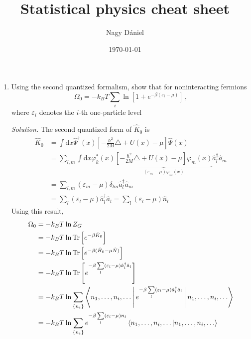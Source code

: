 \documentclass[11pt, a4paper]{article}
\title{Statistical physics cheat sheet}
\author{Nagy Dániel}
\date{\today}
\newcommand{\dd}{\mathrm{d}}
\newcommand{\Tr}[1]{\mathrm{Tr}\left[#1\right]}
\begin{document}
\maketitle
\newpage

\begin{enumerate}
    \item Using the second quantized formalism, show that for noninteracting fermions
    \begin{equation*}
        \Omega_0 = -k_BT\sum\limits_i \ln \left[1 + e^{-\beta(\varepsilon_i - \mu)}\right]\,,
    \end{equation*}
    where $\varepsilon_i$ denotes the $i$-th one-particle level
    \par\textit{Solution.}
    The second quantized form of $\hat K_0$ is 
    \begin{align*}
        \hat K_0 &= \int \dd x \hat\Psi^{\dagger}(x)\left[-\frac{\hbar^2}{2M}\triangle + U(x)
        -\mu\right]\hat\Psi(x) \\
        & = \sum\limits_{l,m} \int \dd x  \varphi_k^*(x)\underbrace{\left[-\frac{\hbar^2}{2M}\triangle + U(x)
        -\mu\right]\varphi_m(x)}_{(\varepsilon_m - \mu)\varphi_m(x)} \hat a_l^{\dagger}\hat a_m \\
        & = \sum\limits_{l,m}(\varepsilon_m - \mu)\delta_{lm} \hat a_l^{\dagger}\hat a_m \\
        & = \sum\limits_l (\varepsilon_l-\mu) \hat a_l^{\dagger}\hat a_l 
        = \sum\limits_l (\varepsilon_l-\mu) \hat n_l
    \end{align*}
    Using this result, 
    \begin{align*}
        \Omega_0 &= -k_BT\ln Z_G\\
        &= -k_BT \ln \Tr{e^{-\beta \hat K_0}}\\
        &= -k_BT \ln \Tr{e^{-\beta (\hat H_0 - \mu\hat N)}}\\
        &= -k_BT \ln \Tr{e^{-\beta \sum\limits_l(\varepsilon_l - \mu)\hat a_l^{\dagger}\hat a_l}}\\
        &= -k_BT \ln \sum\limits_{\{n_i\}}\Braket{n_1, \dots, n_i, \dots | e^{-\beta \sum\limits_l(\varepsilon_l-\mu) \hat a_l^{\dagger} \hat a_l}| n_1, \dots, n_i, \dots }\\
        &= -k_BT \ln \sum\limits_{\{n_i\}} e^{-\beta \sum\limits_l(\varepsilon_l-\mu) n_l} \braket{n_1, \dots, n_i, \dots | n_1, \dots, n_i, \dots }\\

\end{align*}
\end{enumerate}
\end{document}
